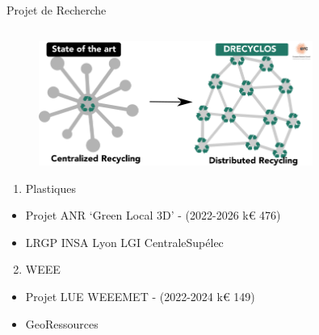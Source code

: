 \documentclass[
  11pt,
  ignorenonframetext,
  aspectratio=169,
  c]{beamer}
\providecommand{\tightlist}{%
  \setlength{\itemsep}{0pt}\setlength{\parskip}{0pt}}\usepackage{longtable,booktabs,array}
\begin{document}
\begin{frame}[t]{Projet de Recherche}
\protect\hypertarget{projet-de-recherche-1}{}
\begin{columns}[T]
\begin{column}{0.6\textwidth}
\begin{figure}

{\centering \includegraphics[width=0.8\textwidth,height=\textheight]{Figures/slides/ERC.png}

}

\end{figure}

\footnotesize

\begin{enumerate}
\tightlist
\item
  Plastiques
\end{enumerate}

\begin{itemize}
\tightlist
\item
  Projet ANR `Green Local 3D' - \tiny (2022-2026 \textbar{} k€ 476)
\item
  \tiny LRGP \textbar{} INSA Lyon \textbar{} LGI CentraleSupélec
\end{itemize}

\begin{enumerate}
\setcounter{enumi}{1}
\tightlist
\item
  WEEE
\end{enumerate}

\begin{itemize}
\tightlist
\item
  Projet LUE WEEEMET - \tiny (2022-2024 \textbar{} k€ 149)
\item
  \tiny GeoRessources
\end{itemize}
\end{column}


\end{columns}
\end{frame}
\end{document}
